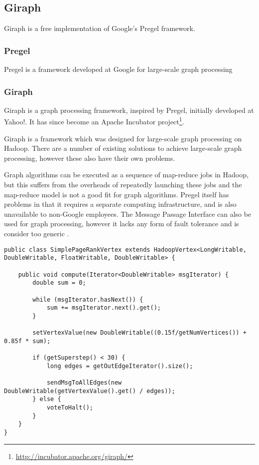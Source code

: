 \subsection{Giraph}
Giraph is a free implementation of Google's Pregel framework.

\subsubsection{Pregel}
Pregel is a framework developed at Google for large-scale graph processing \cite{pregel}

\subsubsection{Giraph}
Giraph is a graph processing framework, inspired by Pregel, initially developed at Yahoo!. It has since become an Apache Incubator project\footnote{\url{http://incubator.apache.org/giraph/}}.

Giraph is a framework which was designed for large-scale graph processing on Hadoop. There are a number of existing solutions to achieve large-scale graph processing, however these also have their own problems.

Graph algorithms can be executed as a sequence of map-reduce jobs in Hadoop, but this suffers from the overheads of repeatedly launching these jobs and the map-reduce model is not a good fit for graph algorithms. Pregel itself has problems in that it requires a separate computing infrastructure, and is also unavailable to non-Google employees. The Message Passage Interface can also be used for graph processing, however it lacks any form of fault tolerance and is consider too generic \cite{giraphtalk}.

\begin{lstlisting}
public class SimplePageRankVertex extends HadoopVertex<LongWritable, DoubleWritable, FloatWritable, DoubleWritable> {

	public void compute(Iterator<DoubleWritable> msgIterator) {
		double sum = 0;
		
		while (msgIterator.hasNext()) {
			sum += msgIterator.next().get();
		}
		
		setVertexValue(new DoubleWritable((0.15f/getNumVertices()) + 0.85f * sum);
		
		if (getSuperstep() < 30) {
			long edges = getOutEdgeIterator().size();
			
			sendMsgToAllEdges(new DoubleWritable(getVertexValue().get() / edges));
		} else {
			voteToHalt();
		}
	}
}					
\end{lstlisting}